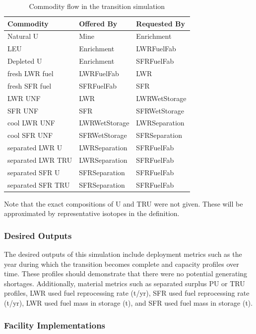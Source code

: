\begin{table}[htbp!]
\centering
\begin{tabular}{|l|l|l|}
\hline
Commodity  &     Offered By  &    Requested By \\
\hline
Natural  U & Mine & Enrichment \\ 
LEU & Enrichment & LWRFuelFab \\ 
Depleted U & Enrichment & SFRFuelFab \\ 
fresh LWR fuel & LWRFuelFab & LWR \\ 
fresh SFR fuel & SFRFuelFab & SFR \\ 
LWR UNF & LWR & LWRWetStorage \\ 
SFR UNF & SFR & SFRWetStorage \\ 
cool LWR UNF & LWRWetStorage & LWRSeparation \\ 
cool SFR UNF & SFRWetStorage & SFRSeparation \\ 
separated LWR U & LWRSeparation & SFRFuelFab \\ 
separated LWR TRU & LWRSeparation & SFRFuelFab \\ 
separated SFR U & SFRSeparation & SFRFuelFab \\ 
separated SFR TRU & SFRSeparation & SFRFuelFab \\ 
\hline
\end{tabular}
\caption{Commodity flow in the transition simulation}
\label{tab:commods}
\end{table}
Note that the exact compositions of U and TRU were not given. These will be
approximated by representative isotopes in the \Cyclus definition.

\subsubsection{Desired Outputs}

The desired outputs of this simulation include deployment metrics such as the 
year during which the transition becomes complete and capacity profiles over 
time. These profiles should demonstrate that there were no potential generating 
shortages. Additionally, material metrics such as separated surplus PU or TRU 
profiles, LWR used fuel reprocessing rate (t/yr), SFR used fuel reprocessing 
rate (t/yr),  LWR used fuel mass in storage (t), and SFR used fuel mass in 
storage (t).

\subsubsection{Facility Implementations}

